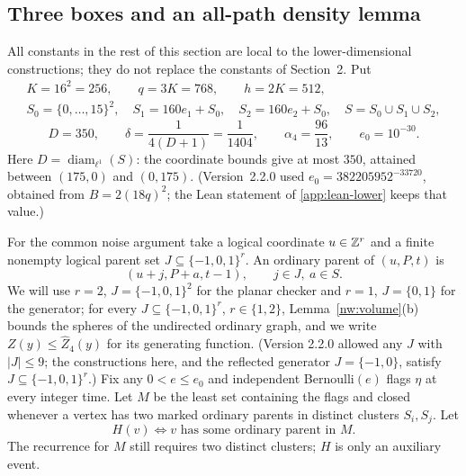 \subsection{Three boxes and an all-path density lemma}

All constants in the rest of this section are local to the lower-dimensional constructions; they do
not replace the constants of Section~2. Put
\begin{equation}\label{ld:setup}
\begin{gathered}
  K=16^2=256,\qquad q=3K=768,\qquad h=2K=512,\\
  S_0=\{0,\dots,15\}^2,\quad S_1=160e_1+S_0,\quad S_2=160e_2+S_0,\quad S=S_0\cup S_1\cup S_2,
\end{gathered}
\end{equation}
\begin{equation}\label{ld:constants}
  D=350,\qquad \delta=\frac{1}{4(D+1)}=\frac1{1404},\qquad
  \alpha_4=\frac{96}{13},\qquad e_0=10^{-30}.
\end{equation}
Here $D=\operatorname{diam}_{\ell^1}(S)$: the coordinate bounds give at most $350$, attained between
$(175,0)$ and $(0,175)$. (Version~2.2.0 used $e_0=382205952^{-33720}$, obtained from
$B=2(18q)^2$; the Lean statement of \cref{app:lean-lower} keeps that value.)

For the common noise argument take a logical coordinate $u\in\mathbb{Z}^r$ and a finite nonempty
logical parent set $J\subseteq\{-1,0,1\}^r$. An ordinary parent of $(u,P,t)$ is
\[
  (u+j,P+a,t-1),\qquad j\in J,\ a\in S .
\]
We will use $r=2$, $J=\{-1,0,1\}^2$ for the planar checker and $r=1$, $J=\{0,1\}$ for the generator;
for every $J\subseteq\{-1,0,1\}^r$, $r\in\{1,2\}$, Lemma~\ref{nw:volume}(b) bounds the spheres of the
undirected ordinary graph, and we write $Z(y)\le\widehat Z_4(y)$ for its generating function. (Version
2.2.0 allowed any $J$ with $|J|\le9$; the constructions here, and the reflected generator
$J=\{-1,0\}$, satisfy $J\subseteq\{-1,0,1\}^r$.) Fix any $0<e\le e_0$ and independent
Bernoulli$(e)$ flags $\eta$ at every integer time. Let $M$ be the least set containing the flags and
closed whenever a vertex has two marked ordinary parents in distinct clusters $S_i,S_j$. Let
\[
  H(v)\iff v\text{ has some ordinary parent in }M.
\]
The recurrence for $M$ still requires two distinct clusters; $H$ is only an auxiliary event.

